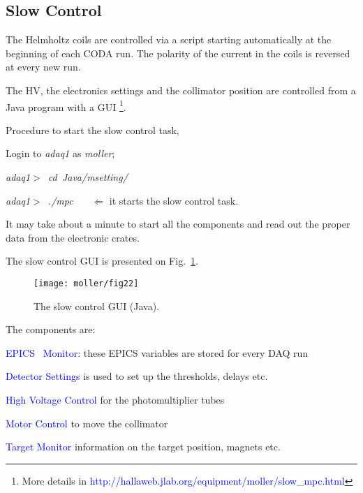 {\subsection {Slow Control}
\label{sec:moller_compon_slow}
\vspace{-\parskip}
The Helmholtz coils are controlled via a script starting automatically
at the beginning of each CODA run. The polarity of the current in the coils
is reversed at every new run.

The HV, the electronics settings and the collimator position
are controlled from a Java program with a GUI%
\footnote{More details in \textcolor{blue}{http://hallaweb.jlab.org/equipment/moller/slow\_mpc.html}}.

Procedure to start the slow control task,
\vspace{-\parskip}
 \begin{list}{--}{\setlength{\itemsep}{-0.15cm}}
   \item Login to {\it adaq1} as {\it moller};
   \item {\it adaq1$>$~cd~Java/msetting/}
   \item {\it adaq1$>$~./mpc} \ \ \ $\Leftarrow$ it starts the slow control task.
 \end{list}
\vspace{-\parskip}
 It may take about a minute to start all the components and read out
 the proper data from the electronic crates.

  The slow control GUI is presented on Fig.~\ref{fig:slow_control}.
   \begin{figure}[htb]
      \begin{center}
          \texttt{[image: moller/fig22]}
      \end{center}
      \caption[M{\o}ller:slow control window]{The slow control GUI (Java).
            }
      \label{fig:slow_control} 
   \end{figure}  

 The components are: 
\vspace{-\parskip}
 \begin{list}{--}{\setlength{\itemsep}{-0.15cm}}
   \item \textcolor{blue}{EPICS~\cite{EPICSwww} Monitor}: these EPICS variables are stored for every DAQ run
   \item \textcolor{blue}{Detector Settings} is used to set up the thresholds, delays etc.
   \item \textcolor{blue}{High Voltage Control} for the photomultiplier tubes
   \item \textcolor{blue}{Motor Control} to move the collimator
   \item \textcolor{blue}{Target Monitor} information on the target position, magnets etc.
 \end{list}

}
